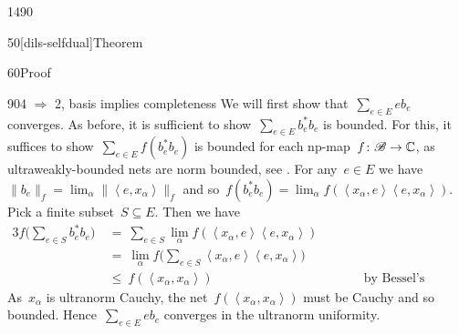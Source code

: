 \begin{parsec}{1490}
\begin{point}{50}[dils-selfdual]{Theorem}
\begin{point}{60}{Proof}
\begin{point}{90}{4 $\Rightarrow$ 2, basis implies completeness}
We will first show that~$\sum_{e \in E} e b_e$ converges.
As before, it is sufficient to show~$\sum_{e \in E} b_e^*b_e$ is bounded.
For this, it suffices to show~$\sum_{e\in E} f( b_e^*b_e ) $ is bounded
        for each np-map~$f\colon \mathscr{B} \to \mathbb{C}$,
    as ultraweakly-bounded nets are norm bounded,
    see .
For any~$e \in E$
    we have~$\|b_e\|_f = \lim_\alpha \|\left<e,x_\alpha\right>\|_f$
    and so~$f(b_e^*b_e) =\lim_\alpha f(\left<x_\alpha,e\right> \left<e, x_\alpha\right>)$.
    Pick a finite subset~$S \subseteq E$. Then we have
\begin{alignat*}{3}
    f\bigl(\sum_{e \in S} b_e^*b_e\bigr)
    &\ =\  \sum_{e \in S} \lim_\alpha 
     f(\left<x_\alpha,e\right> \left<e, x_\alpha\right>) \\
     &\  = \ \lim_\alpha 
            f\bigl(\sum_{e \in S}\left<x_\alpha,e\right>
                \left<e, x_\alpha\right>\bigr) \\
            &\ \leq\  f(\left<x_\alpha,x_\alpha\right>)
                &\qquad&\text{by Bessel's inequality.}
 \end{alignat*}
As~$x_\alpha$ is ultranorm Cauchy,
the net~$f(\left<x_\alpha,x_\alpha\right>)$
    must be Cauchy and so bounded.
Hence~$\sum_{e \in E} e b_e$ converges in the ultranorm uniformity.


\end{point}
\end{point}
\end{point}
\end{parsec}
